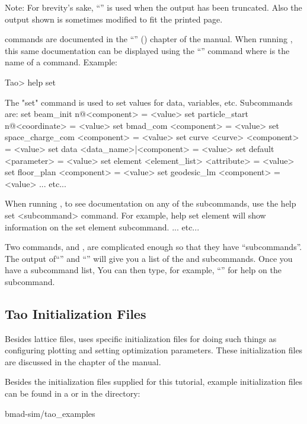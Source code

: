 \documentclass{hitec}     %
\begin{document}
Note: For brevity's sake, ``'' is used when the output has been truncated. Also the output shown
is sometimes modified to fit the printed page.

\tao commands are documented in the ``'' () chapter of the \tao
manual.  When running \tao, this same documentation can be displayed using the ``'' command where  is the name of a command. Example:
\begin{code}
Tao> help set

The "set" command is used to set values for data, variables, etc. 
Subcommands are:
  set beam_init {n@}<component> = <value>
  set particle_start {n@}<coordinate> = <value>
  set bmad_com <component> = <value>
  set space_charge_com <component> = <value>
  set curve <curve> <component> = <value>
  set data <data_name>|<component> = <value>
  set default <parameter> = <value>
  set element <element_list> <attribute> = <value>
  set floor_plan <component> = <value>
  set geodesic_lm <component> = <value>
... etc...

When running \tao, to see documentation on any of the subcommands, use the 
help set <subcommand> command. For example, help set element
will show information on the set element subcommand.
... etc...
\end{code}

Two commands,  and , are complicated enough so that they have ``subcommands''. The
output of``'' and ``'' will give you a list of the  and 
subcommands. Once you have a subcommand list, You can then type, for example, ``'' for help on the  subcommand.

\subsection{Tao Initialization Files}
\label{s:init.file}

Besides lattice files, \tao uses \tao specific initialization files for doing such things as
configuring plotting and setting optimization parameters. These initialization files are discussed
in the  chapter of the \tao manual.

Besides the initialization files supplied for this tutorial, example \tao initialization files can
be found in a  or  in the directory:
\begin{code}
bmad-sim/tao_examples
\end{code}
\end{document}
